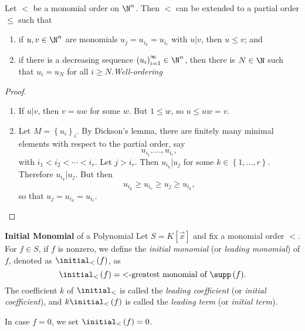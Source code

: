 \documentclass[co439]{subfiles}
\begin{document}
    \begin{prop}{}
        Let $<$ be a monomial order on $\N^n$. Then $<$ can be extended to a partial order $\leq$ such that
        \begin{enumerate}
            \item if $u,v\in\N^n$ are monomials $u_j = u_{i_k} = u_{i_r}$ with $u|v$, then $u\leq v$; and
            \item if there is a decreasing sequence $\left( u_{i} \right)^{\infty}_{i=1}\in\N^n$, then there is $N\in\N$ such that $u_i=u_N$ for all $i\geq N$.\hfill\textit{Well-ordering}
        \end{enumerate}
    \end{prop}
    
    \begin{proof}
        \begin{enumerate}
            \item If $u|v$, then $v=uw$ for some $w$. But $1\leq w$, so $u\leq uw=v$.

            \item Let $M = \left\lbrace u_i \right\rbrace_i$. By Dickson's lemma, there are finitely many minimal elements with respect to the partial order, say
                \begin{equation*}
                    u_{i_1}, \ldots, u_{i_r},
                \end{equation*}
                with $i_1<i_2<\cdots<i_r$. Let $j>i_r$. Then $u_{i_k}|u_j$ for some $k\in\left\lbrace 1,\ldots,r \right\rbrace$. Therefore $u_{i_k}|u_j$. But then
                \begin{equation*}
                    u_{i_k} \geq u_{i_r} \geq u_j \geq u_{i_k},
                \end{equation*}
                so that $u_j = u_{i_k} = u_{i_r}$.
        \end{enumerate}
    \end{proof}

    \clearpage
    
    \begin{definition}{\textbf{Initial Monomial} of a Polynomial}
        Let $S = K\left[ \vec{x} \right]$ and fix a monomial order $<$. For $f\in S$, if $f$ is nonzero, we define the \emph{initial monomial} (or \emph{leading monomial}) of $f$, denoted as $\initial_<\left( f \right)$, as
        \begin{equation*}
            \initial_< \left( f \right) = \text{$<$-greatest monomial of $\supp\left( f \right)$}.
        \end{equation*}
        The coefficient $k$ of $\initial_<$ is called the \emph{leading coefficient} (or \emph{initial coefficient}), and $k\initial_<\left( f \right)$ is called the \emph{leading term} (or \emph{initial term}).

        In case $f=0$, we set $\initial_<\left( f \right)=0$.
    \end{definition}
\end{document}
